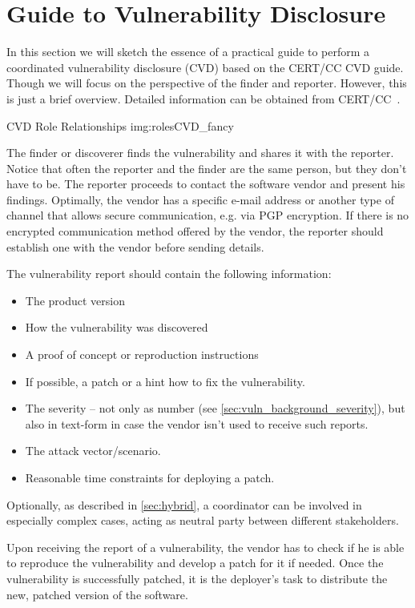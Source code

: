 \section{Guide to Vulnerability Disclosure}\label{sec:guide}

In this section we will sketch the essence of a practical guide to perform a coordinated vulnerability disclosure (CVD) based on the CERT/CC CVD guide. Though we will focus on the perspective of the finder and reporter. However, this is just a brief overview. Detailed information can be obtained from CERT/CC~\cite{CertGuideCVD}.

        {CVD Role Relationships \cite{CertGuideCVD}}
        {img:rolesCVD_fancy}

The finder or discoverer finds the vulnerability and shares it with the reporter. Notice that often the reporter and the finder are the same person, but they don't have to be. The reporter proceeds to contact the software vendor and present his findings. Optimally, the vendor has a specific e-mail address or another type of channel that allows secure communication, e.g. via PGP encryption. If there is no encrypted communication method offered by the vendor, the reporter should establish one with the vendor before sending details.

The vulnerability report should contain the following information:
\begin{itemize}
	\item The product version
	\item How the vulnerability was discovered
	\item A proof of concept or reproduction instructions
	\item If possible, a patch or a hint how to fix the vulnerability.
	\item The severity -- not only as number (see \autoref{sec:vuln_background_severity}), but also in text-form in case the vendor isn't used to receive such reports.
	\item The attack vector/scenario.
	\item Reasonable time constraints for deploying a patch.
\end{itemize} 

Optionally, as described in \autoref{sec:hybrid}, a coordinator can be involved in especially complex cases, acting as neutral party between different stakeholders.

Upon receiving the report of a vulnerability, the vendor has to check if he is able to reproduce the vulnerability and develop a patch for it if needed. Once the vulnerability is successfully patched, it is the deployer's task to distribute the new, patched version of the software. 

